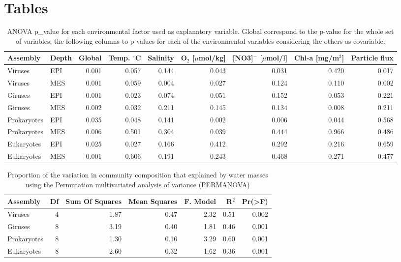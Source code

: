 \documentclass[fleqn,10pt]{wlscirep}
\begin{document}
\section*{Tables}

\begin{table}[ht]
\centering
\caption{\label{tab:CCA} ANOVA p\_value for each environmental factor used as explanatory variable. Global correspond to the p-value for the whole set of variables, the following columns to p-values for each of the environmental variables considering the others as covariable.}
\begin{tabular}{llrrrrrrr}
\hline
 Assembly& Depth & Global & Temp. $^\circ$C & Salinity & O$_2$ [$\mu$mol/kg] &[NO3]$^-$  [$\mu$mol/l]	& Chl-a [mg/m$^3$] &	 Particle flux\\
\hline
\hline
Viruses & EPI & 0.001 & 0.057 & 0.144 & 0.043 & 0.031 & 0.420 & 0.017\\
Viruses & MES & 0.001 & 0.059 & 0.004 & 0.027 & 0.124 & 0.110 & 0.002\\
Giruses & EPI & 0.001 & 0.023 & 0.074 & 0.051 & 0.152 & 0.053 & 0.221\\
Giruses & MES & 0.002 & 0.032 & 0.211 & 0.145 & 0.134 & 0.008 & 0.211\\
Prokaryotes & EPI & 0.035 & 0.048 & 0.141 & 0.002 & 0.006 & 0.044 & 0.568\\
Prokaryotes & MES & 0.006 & 0.501 & 0.304 & 0.039 & 0.444 & 0.966 & 0.486\\
Eukaryotes & EPI & 0.025 & 0.027 & 0.166 & 0.412 & 0.292 & 0.216 & 0.659\\
Eukaryotes & MES & 0.001 & 0.606 & 0.191 & 0.243 & 0.468 & 0.271 & 0.477\\
\hline
\hline
\end{tabular}
\end{table}

\begin{table}[ht]
\centering
\caption{\label{tab:PWM} Proportion of the variation in community composition that explained by water masses using the Permutation multivariated analysis of variance (PERMANOVA)}
\begin{tabular}{lrrrrrr}
\hline
Assembly & Df & Sum Of Squares & Mean Squares & F. Model & R$^2$ & Pr(>F) \\
\hline
\hline
Viruses	& 4	& 1.87 &	0.47 & 2.32 &	0.51 &	0.002\\
Giruses	& 8	& 3.19 &	0.40 & 1.81 &	0.46 &	0.001\\
Prokaryotes & 8	& 1.30 &	0.16 & 3.29 &	0.60 &	0.001\\
Eukaryotes	& 8	& 2.60 &	0.32 & 1.62 &	0.36 &	0.001\\
\hline
\hline
\end{tabular}
\end{table}
\end{document}
